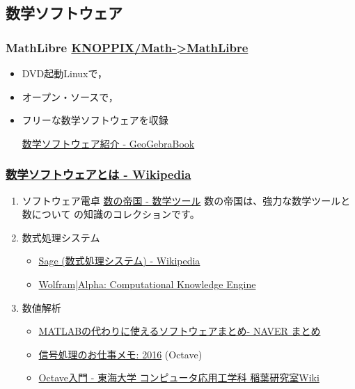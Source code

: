 \documentclass[dvipdfmx,11pat]{jarticle}
\begin{document}
\subsection{数学ソフトウェア}
\label{sec:org46fdd24}
\subsubsection{MathLibre  \href{https://www.geogebra.org/m/hShSTr6e}{KNOPPIX/Math->MathLibre}}
\label{sec:org3c2c359}
\begin{itemize}
\item DVD起動Linuxで，
\item オープン・ソースで，
\item フリーな数学ソフトウェアを収録 

\href{https://www.geogebra.org/m/hShSTr6e}{数学ソフトウェア紹介 - GeoGebraBook}
\end{itemize}
\subsubsection{\href{https://ja.wikipedia.org/wiki/\%E6\%95\%B0\%E5\%AD\%A6\%E3\%82\%BD\%E3\%83\%95\%E3\%83\%88\%E3\%82\%A6\%E3\%82\%A7\%E3\%82\%A2}{数学ソフトウェアとは - Wikipedia}}
\label{sec:orgb0ed0ba}
\begin{enumerate}
\item ソフトウェア電卓  
\href{http://ja.numberempire.com/}{数の帝国 - 数学ツール} 数の帝国は、強力な数学ツールと数について
の知識のコレクションです。
\item 数式処理システム
\begin{itemize}
\item \href{https://ja.wikipedia.org/wiki/Sage\_(\%E6\%95\%B0\%E5\%BC\%8F\%E5\%87\%A6\%E7\%90\%86\%E3\%82\%B7\%E3\%82\%B9\%E3\%83\%86\%E3\%83\%A0)}{Sage (数式処理システム) - Wikipedia}
\item \href{http://www.wolframalpha.com/}{Wolfram|Alpha: Computational Knowledge Engine}
\end{itemize}
\item 数値解析
\begin{itemize}
\item \href{https://matome.naver.jp/odai/2136163231573327601}{MATLABの代わりに使えるソフトウェアまとめ- NAVER まとめ}
\item \href{http://signalprocessor.blogspot.jp/2016/}{信号処理のお仕事メモ: 2016} (Octave)
\item \href{http://www.inaba-lab.org/wiki/index.php/Octave\%E5\%85\%A5\%E9\%96\%80}{Octave入門 - 東海大学 コンピュータ応用工学科 稲葉研究室Wiki}
\end{itemize}
\end{enumerate}
\end{document}
